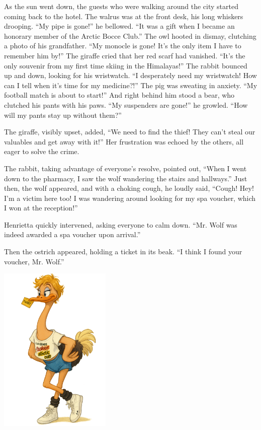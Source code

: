 As the sun went down, the guests who were walking around the city started coming back to the hotel. The walrus was at the front desk, his long whiskers drooping. ``My pipe is gone!'' he bellowed. ``It was a gift when I became an honorary member of the Arctic Bocce Club.'' The owl hooted in dismay, clutching a photo of his grandfather. ``My monocle is gone! It's the only item I have to remember him by!'' The giraffe cried that her red scarf had vanished. ``It's the only souvenir from my first time skiing in the Himalayas!'' The rabbit bounced up and down, looking for his wristwatch. ``I desperately need my wristwatch! How can I tell when it's time for my medicine?!'' The pig was sweating in anxiety. ``My football match is about to start!'' And right behind him stood a bear, who clutched his pants with his paws. ``My suspenders are gone!'' he growled. ``How will my pants stay up without them?''

The giraffe, visibly upset, added, ``We need to find the thief! They can't steal our valuables and get away with it!'' Her frustration was echoed by the others, all eager to solve the crime.

The rabbit, taking advantage of everyone's resolve, pointed out, ``When I went down to the pharmacy, I saw the wolf wandering the stairs and hallways.'' Just then, the wolf appeared, and with a choking cough, he loudly said, ``Cough! Hey! I'm a victim here too! I was wandering around looking for my spa voucher, which I won at the reception!''

Henrietta quickly intervened, asking everyone to calm down. ``Mr. Wolf was indeed awarded a spa voucher upon arrival.''

Then the ostrich appeared, holding a ticket in its beak. ``I think I found your voucher, Mr. Wolf.''

\begin{center}
\includegraphics[width=0.4\textwidth]{images/ostrich.png}
\end{center}

